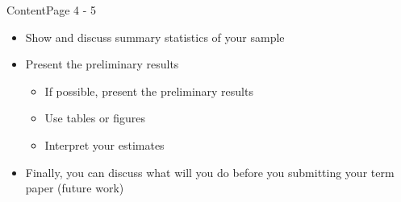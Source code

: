 \documentclass[dvipsnames,hyperref={pdfpagelabels=false}]{beamer}
\begin{document}
\begin{frame}{Content}{Page 4 - 5}
	\begin{itemize} 
		\item Show and discuss summary statistics of your sample
		\vspace{0.2cm}
	    \item Present the preliminary results
	    		\vspace{0.2cm}
	    	\begin{itemize} 
	    	\item If possible, present the preliminary results
	    \vspace{0.2cm} 
	    	    \item Use tables or figures		
	    	    	    	    \vspace{0.2cm} 	
	    \item Interpret your estimates	


	    			\end{itemize}
    		\vspace{0.2cm}
    	\item Finally, you can discuss what will you do before you submitting your term paper (future work)		
	\end{itemize}
\end{frame}

		

	
\end{document}
